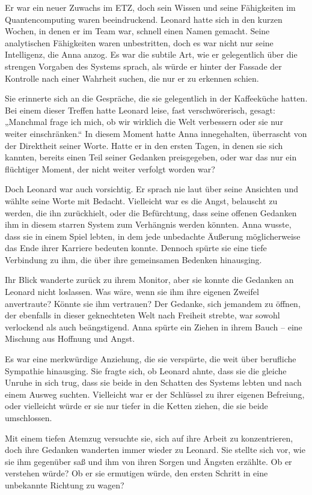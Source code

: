 \documentclass[
]{article}
\begin{document}
Er war ein neuer Zuwachs im ETZ, doch sein Wissen und seine Fähigkeiten
im Quantencomputing waren beeindruckend. Leonard hatte sich in den
kurzen Wochen, in denen er im Team war, schnell einen Namen gemacht.
Seine analytischen Fähigkeiten waren unbestritten, doch es war nicht nur
seine Intelligenz, die Anna anzog. Es war die subtile Art, wie er
gelegentlich über die strengen Vorgaben des Systems sprach, als würde er
hinter der Fassade der Kontrolle nach einer Wahrheit suchen, die nur er
zu erkennen schien.

Sie erinnerte sich an die Gespräche, die sie gelegentlich in der
Kaffeeküche hatten. Bei einem dieser Treffen hatte Leonard leise, fast
verschwörerisch, gesagt: „Manchmal frage ich mich, ob wir wirklich die
Welt verbessern oder sie nur weiter einschränken.`` In diesem Moment
hatte Anna innegehalten, überrascht von der Direktheit seiner Worte.
Hatte er in den ersten Tagen, in denen sie sich kannten, bereits einen
Teil seiner Gedanken preisgegeben, oder war das nur ein flüchtiger
Moment, der nicht weiter verfolgt worden war?

Doch Leonard war auch vorsichtig. Er sprach nie laut über seine
Ansichten und wählte seine Worte mit Bedacht. Vielleicht war es die
Angst, belauscht zu werden, die ihn zurückhielt, oder die Befürchtung,
dass seine offenen Gedanken ihm in diesem starren System zum Verhängnis
werden könnten. Anna wusste, dass sie in einem Spiel lebten, in dem jede
unbedachte Äußerung möglicherweise das Ende ihrer Karriere bedeuten
konnte. Dennoch spürte sie eine tiefe Verbindung zu ihm, die über ihre
gemeinsamen Bedenken hinausging.

Ihr Blick wanderte zurück zu ihrem Monitor, aber sie konnte die Gedanken
an Leonard nicht loslassen. Was wäre, wenn sie ihm ihre eigenen Zweifel
anvertraute? Könnte sie ihm vertrauen? Der Gedanke, sich jemandem zu
öffnen, der ebenfalls in dieser geknechteten Welt nach Freiheit strebte,
war sowohl verlockend als auch beängstigend. Anna spürte ein Ziehen in
ihrem Bauch -- eine Mischung aus Hoffnung und Angst.

Es war eine merkwürdige Anziehung, die sie verspürte, die weit über
berufliche Sympathie hinausging. Sie fragte sich, ob Leonard ahnte, dass
sie die gleiche Unruhe in sich trug, dass sie beide in den Schatten des
Systems lebten und nach einem Ausweg suchten. Vielleicht war er der
Schlüssel zu ihrer eigenen Befreiung, oder vielleicht würde er sie nur
tiefer in die Ketten ziehen, die sie beide umschlossen.

Mit einem tiefen Atemzug versuchte sie, sich auf ihre Arbeit zu
konzentrieren, doch ihre Gedanken wanderten immer wieder zu Leonard. Sie
stellte sich vor, wie sie ihm gegenüber saß und ihm von ihren Sorgen und
Ängsten erzählte. Ob er verstehen würde? Ob er sie ermutigen würde, den
ersten Schritt in eine unbekannte Richtung zu wagen?
\end{document}
